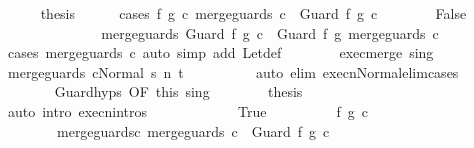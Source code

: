 \begin{isabellebody}
\ \ \ \ \isamarkupfalse%
\ {\isacharquery}thesis\isanewline
\ \ \ \ \isamarkupfalse%
\ {\isacharparenleft}cases\ {\isachardoublequoteopen}{\isasymexists}f{\isacharprime}\ g{\isacharprime}\ c{\isacharprime}{\isachardot}\ merge{\isacharunderscore}guards\ c\ {\isacharequal}\ Guard\ f{\isacharprime}\ g{\isacharprime}\ c{\isacharprime}{\isachardoublequoteclose}{\isacharparenright}\isanewline
\ \ \ \ \ \ \isamarkupfalse%
\ False\isanewline
\ \ \ \ \ \ \isamarkupfalse%
\isanewline
\ \ \ \ \ \ \isamarkupfalse%
\ {\isachardoublequoteopen}merge{\isacharunderscore}guards\ {\isacharparenleft}Guard\ f\ g\ c{\isacharparenright}\ {\isacharequal}\ Guard\ f\ g\ {\isacharparenleft}merge{\isacharunderscore}guards\ c{\isacharparenright}{\isachardoublequoteclose}\isanewline
\ \ \ \ \ \ \ \ \isamarkupfalse%
\ {\isacharparenleft}cases\ {\isachardoublequoteopen}merge{\isacharunderscore}guards\ c{\isachardoublequoteclose}{\isacharparenright}\ {\isacharparenleft}auto\ simp\ add{\isacharcolon}\ Let{\isacharunderscore}def{\isacharparenright}\isanewline
\ \ \ \ \ \ \isamarkupfalse%
\ exec{\isacharunderscore}merge\ s{\isacharunderscore}in{\isacharunderscore}g\isanewline
\ \ \ \ \ \ \isamarkupfalse%
\ {\isachardoublequoteopen}{\isasymGamma}{\isasymturnstile}{\isasymlangle}merge{\isacharunderscore}guards\ c{\isacharcomma}Normal\ s{\isasymrangle}\ {\isacharequal}n{\isasymRightarrow}\ t{\isachardoublequoteclose}\isanewline
\ \ \ \ \ \ \ \ \isamarkupfalse%
\ {\isacharparenleft}auto\ elim{\isacharcolon}\ execn{\isacharunderscore}Normal{\isacharunderscore}elim{\isacharunderscore}cases{\isacharparenright}\isanewline
\ \ \ \ \ \ \isamarkupfalse%
\ Guard{\isachardot}hyps\ {\isacharbrackleft}OF\ this{\isacharbrackright}\ s{\isacharunderscore}in{\isacharunderscore}g\isanewline
\ \ \ \ \ \ \isamarkupfalse%
\ {\isacharquery}thesis\isanewline
\ \ \ \ \ \ \ \ \isamarkupfalse%
\ {\isacharparenleft}auto\ intro{\isacharcolon}\ execn{\isachardot}intros{\isacharparenright}\isanewline
\ \ \ \ \isamarkupfalse%
\isanewline
\ \ \ \ \ \ \isamarkupfalse%
\ True\isanewline
\ \ \ \ \ \ \isamarkupfalse%
\ \isamarkupfalse%
\ f{\isacharprime}\ g{\isacharprime}\ c{\isacharprime}\ \ \isanewline
\ \ \ \ \ \ \ \ merge{\isacharunderscore}guards{\isacharunderscore}c{\isacharcolon}\ {\isachardoublequoteopen}merge{\isacharunderscore}guards\ c\ {\isacharequal}\ Guard\ f{\isacharprime}\ g{\isacharprime}\ c{\isacharprime}{\isachardoublequoteclose}\isanewline

\end{isabellebody}
